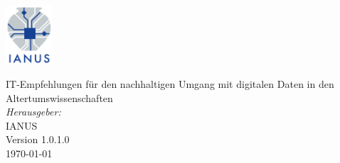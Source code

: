 \newcommand{\titel}[1]{{\LARGE \sffamily #1}}

\newcommand{\leadingzero}[1]{\ifnum #1<10 0\the#1\else\the#1\fi}

\newcommand{\datum}{\the\day.\the\month.\the\year}

\newcommand{\HRule}{\rule{\linewidth}{0.4mm}}

%
\thispagestyle{empty}
\begin{titlepage}

\begin{center}
\begin{flushleft}
\includegraphics[width=0.13\textwidth]{deckblattLogos/ianus.png}\\[3cm]
\end{flushleft}
\titel{IT-Empfehlungen für den nachhaltigen Umgang mit digitalen Daten in den Altertumswissenschaften}\\[0.2cm]
\tib{\HRule \\[1.0cm]}
\large
\emph{Herausgeber:}\\
\textsc{IANUS}\\[1cm]
Version 1.0.1.0\\
{\large \today}
\end{center}


\end{titlepage}
